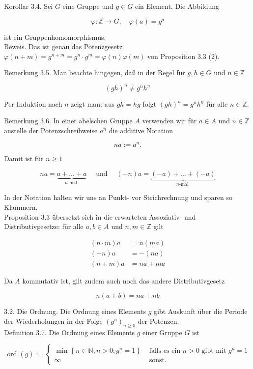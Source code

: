\documentclass[10pt, letterpaper]{article}
\begin{document}
Korollar 3.4. Sei $G$ eine Gruppe und $g \in G$ ein Element. Die Abbildung

$$
\varphi: \mathbb{Z} \rightarrow G, \quad \varphi(a)=g^{a}
$$

ist ein Gruppenhomomorphismus.\\
Beweis. Das ist genau das Potenzgesetz $\varphi(n+m)=g^{n+m}=g^{n} \cdot g^{m}=\varphi(n) \varphi(m)$ von Proposition 3.3 (2).

Bemerkung 3.5. Man beachte hingegen, daß in der Regel für $g, h \in G$ und $n \in \mathbb{Z}$

$$
(g h)^{n} \neq g^{n} h^{n}
$$

Per Induktion nach $n$ zeigt man: aus $g h=h g$ folgt $(g h)^{n}=g^{n} h^{n}$ für alle $n \in \mathbb{Z}$.

Bemerkung 3.6. In einer abelschen Gruppe $A$ verwenden wir für $a \in A$ und $n \in \mathbb{Z}$ anstelle der Potenzschreibweise $a^{n}$ die additive Notation

$$
n a:=a^{n} .
$$

Damit ist für $n \geq 1$

$$
n a=\underbrace{a+\ldots+a}_{n \text {-mal }} \quad \text { und } \quad(-n) a=\underbrace{(-a)+\ldots+(-a)}_{n \text {-mal }}
$$

In der Notation halten wir uns an Punkt- vor Strichrechnung und sparen so Klammern.\\
Proposition 3.3 übersetzt sich in die erwarteten Assoziativ- und Distributivgesetze: für alle $a, b \in A$ und $n, m \in \mathbb{Z}$ gilt

$$
\begin{aligned}
(n \cdot m) a & =n(m a) \\
(-n) a & =-(n a) \\
(n+m) a & =n a+m a
\end{aligned}
$$

Da $A$ kommutativ ist, gilt zudem auch noch das andere Distributivgesetz

$$
n(a+b)=n a+n b
$$

3.2. Die Ordnung. Die Ordnung eines Elements $g$ gibt Auskunft über die Periode der Wiederholungen in der Folge $\left(g^{n}\right)_{n \geq 0}$ der Potenzen.\\
Definition 3.7. Die Ordnung eines Elements $g$ einer Gruppe $G$ ist

$$
\operatorname{ord}(g):= \begin{cases}\min \left\{n \in \mathbb{N}, n>0 ; g^{n}=1\right\} & \text { falls es ein } n>0 \text { gibt mit } g^{n}=1 \\ \infty & \text { sonst. }\end{cases}
$$
\end{document}
